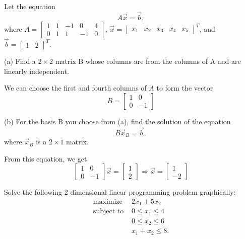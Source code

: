 \documentclass[12pt]{extarticle}
\theoremstyle{definition}
\begin{document}
\begin{problem}
Let the equation 
\[A\vec{x}=\vec{b},\]
where $A=\begin{bmatrix}
1&1&-1&0&4\\0&1&1&-1&0
\end{bmatrix}$, $\vec{x}=\begin{bmatrix}
x_1&x_2&x_3&x_4&x_5
\end{bmatrix}^T$, and $\vec{b}=\begin{bmatrix}
1&2
\end{bmatrix}^T$.

\begin{description}
	\item{(a)} Find a $2\times 2$ matrix B whose columns are from the columns of A and are linearly independent.

		We can choose the first and fourth columns of $A$ to form the 
		vector $$B = \begin{bmatrix} 1 & 0\\ 0 & -1\end{bmatrix}$$

	\item{(b)} For the basis B you choose from (a), find the solution of the equation 
	\[B\vec{x}_B=\vec{b},\]
	where $\vec{x}_B$ is a $2\times 1$ matrix.

	From this equation, we get $$\begin{bmatrix} 1 & 0\\ 0 & -1\end{bmatrix}\vec{x} = \begin{bmatrix} 1\\ 2 \end{bmatrix} 
	\Longrightarrow \vec{x} = \begin{bmatrix} 1 \\ -2\end{bmatrix}$$

\end{description}
\end{problem}


\begin{problem}
Solve the following 2 dimensional linear programming problem graphically:
\begin{align*}
\text{maximize } &2x_1+5x_2\\
\text{subject to } &0\leq x_1\leq 4\\
& 0\leq x_2\leq 6\\
&x_1+x_2\leq 8.
\end{align*}

\end{problem}


\small


\end{document}
